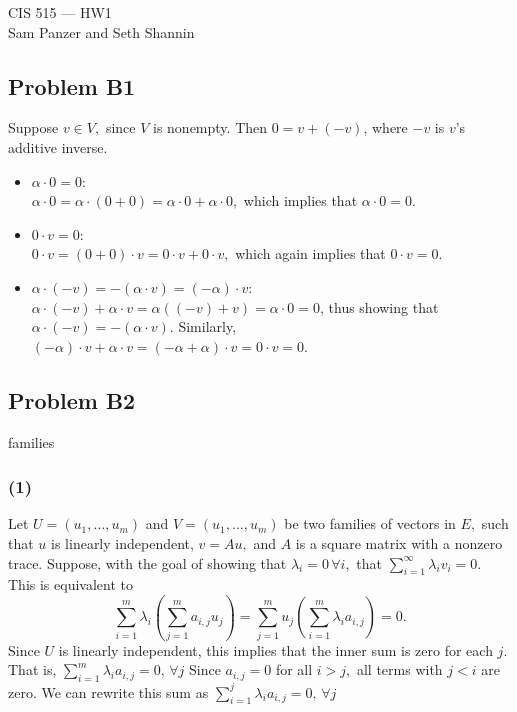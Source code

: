 \documentclass{article}
\begin{document}
\begin{center}CIS 515 --- HW1\\Sam Panzer and Seth Shannin\end{center}
\subsection{Problem B1}
  Suppose $v \in V,$ since $V$ is nonempty. Then $0 = v + (-v)$, where $-v$ is $v$'s additive inverse.
\begin{itemize}
  \item $\alpha \cdot 0 = 0$:\\
    $\alpha\cdot 0 = \alpha\cdot(0 + 0) = \alpha\cdot 0 + \alpha\cdot 0,$ which
    implies that $\alpha\cdot 0 = 0.$
  \item $0\cdot v = 0$: \\
    $0 \cdot v = (0 + 0)\cdot v = 0 \cdot v + 0 \cdot v,$ which again implies
    that $0 \cdot v = 0.$
  \item $\alpha \cdot (-v) = -(\alpha \cdot v) = (-\alpha) \cdot v$:\\
  $\alpha \cdot (-v) + \alpha \cdot v = \alpha ((-v) + v) = \alpha \cdot 0 = 0$,
  thus showing that $\alpha \cdot (-v) =  -(\alpha \cdot v).$ Similarly,
  $(-\alpha) \cdot v + \alpha \cdot v = (-\alpha + \alpha)\cdot v =
  0 \cdot v = 0$.
  \end{itemize}

\subsection{Problem B2}families
\subsubsection{(1)}
Let $U = (u_1,\dots,u_m)$ and $V = (u_1,\dots,u_m)$ be two families of
vectors in $E,$ such that $u$ is linearly independent, $v = Au,$ and $A$
is a square matrix with a nonzero trace.
Suppose, with the goal of showing that $\lambda_i = 0\, \forall i,$ that 
$\displaystyle{\sum_{i=1}^\infty \lambda_i v_i = 0}.$ This is equivalent to
\[ \sum_{i=1}^m\lambda_i\left( \sum_{j=1}^m a_{i,j}u_j \right) = 
   \sum_{j=1}^m u_j\left( \sum_{i=1}^m \lambda_i a_{i,j} \right) = 0.
\]
Since $U$ is linearly independent, this implies that the inner sum is zero for
each $j.$ That is,
$\displaystyle{ \sum_{i=1}^m \lambda_i a_{i,j} = 0, \,\forall j }$
Since $a_{i,j} = 0$ for all $i > j,$ all terms with $j < i$ are zero. We can
rewrite this sum as
$\displaystyle{ \sum_{i=1}^j \lambda_i a_{i,j} = 0, \,\forall j }$
\end{document}
